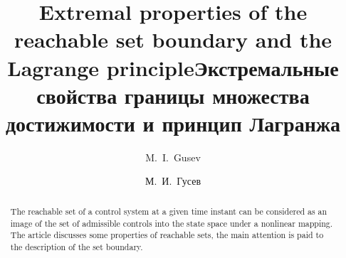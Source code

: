 \begin{englishtitle} %
\title{Extremal properties of the reachable set boundary and the Lagrange principle}
\author{M.~I.~Gusev
}

\maketitle

\begin{abstract}
 The reachable set of a control system at a given time instant can be considered as an image of the set of admissible controls into  the state space under a nonlinear mapping. The article discusses some properties of  reachable sets, the main attention is paid  to the description  of the set boundary.

\end{abstract}
\end{englishtitle}

\iffalse
\documentclass[12pt]{llncs}  


\usepackage{iftex}

\ifPDFTeX
\usepackage[T2A]{fontenc}
\usepackage[utf8]{inputenc} %
\usepackage[english,russian]{babel}
\fi

\usepackage{todonotes} 

\usepackage[russian]{nla}
\newtheorem{theo}{Теорема}


\fi

\title{Экстремальные свойства границы множества достижимости и принцип Лагранжа}
\author{М.~И.~Гусев}  



\maketitle

